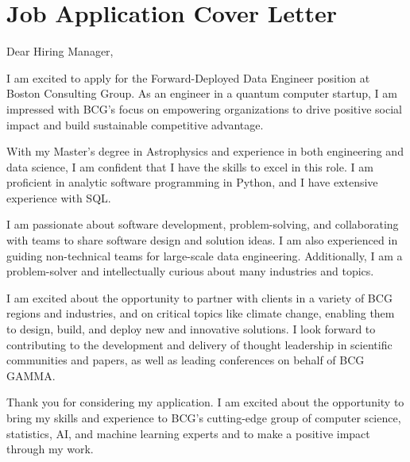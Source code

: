 \section{Job Application Cover Letter}
Dear Hiring Manager,

I am excited to apply for the Forward-Deployed Data Engineer position at Boston Consulting Group. As an  engineer in a quantum computer startup, I am impressed with BCG's focus on empowering organizations to drive positive social impact and build sustainable competitive advantage.

With my Master's degree in Astrophysics and experience in both engineering and data science, I am confident that I have the skills to excel in this role. I am proficient in analytic software programming in Python, and I have extensive experience with SQL.

I am passionate about software development, problem-solving, and collaborating with teams to share software design and solution ideas. I am also experienced in guiding non-technical teams for large-scale data engineering. Additionally, I am a problem-solver and intellectually curious about many industries and topics.

I am excited about the opportunity to partner with clients in a variety of BCG regions and industries, and on critical topics like climate change, enabling them to design, build, and deploy new and innovative solutions. I look forward to contributing to the development and delivery of thought leadership in scientific communities and papers, as well as leading conferences on behalf of BCG GAMMA.

Thank you for considering my application. I am excited about the opportunity to bring my skills and experience to BCG's cutting-edge group of computer science, statistics, AI, and machine learning experts and to make a positive impact through my work.


